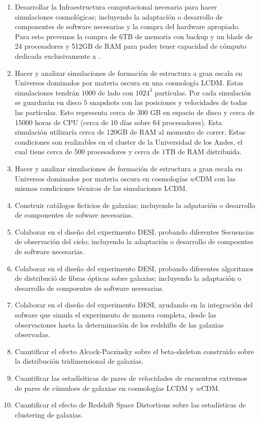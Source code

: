 \begin{enumerate}
\item Desarrollar la Infraestructura computacional necesaria para hacer simulaciones cosmol\'ogicas; incluyendo la adaptaci\'on o desarrollo de componentes de software necesarias y la compra del hardware apropiado. Para esto prevemos la compra de 6TB de memoria con backup y un blade de 24 procesadores y 512GB de RAM para poder tener capacidad de c\'omputo dedicada exclusivamente a \coco.
\item Hacer y analizar simulaciones de formaci\'on de estructura a gran escala en Universos dominados por materia oscura en una cosmolog\'ia LCDM. Estas simulaciones tendr\'an $1000$ \hMpc de lado con $1024^3$ part\'iculas. Por cada simulaci\'on se guardar\'an en disco $5$ snapshots con las posiciones y velocidades de todas las part\'iculas. Esto representa cerca de $300$ GB en espacio de disco y cerca de 15000 horas de CPU (cerca de 10 d\'ias sobre 64 procesadores). Esta simulaci\'on utilizar\'ia cerca de 120GB de RAM al momento de correr. Estas condiciones son realizables en el cluster de la Universidad de los Andes, el cual tiene cerca de $500$ procesadores y cerca de $1$TB de RAM distribuida.
\item Hacer y analizar simulaciones de formaci\'on de estructura a gran escala en Universos dominados por materia oscura en cosmolog\'ias $w$CDM con las mismas condiciones t\'ecnicas de las simulaciones LCDM.
\item Construir cat\'alogos ficticios de galaxias; incluyendo la adpataci\'on o desarrollo de componentes de sofware necesarias.
\item Colaborar en el dise\~no del experimento DESI, probando diferentes Secuencias de observaci\'on del cielo; 
incluyendo la adaptaci\'on o desarrollo de compoentes de software necesarias.
\item Colaborar en el dise\~no del experimento DESI, probando diferentes algoritmos de distribuci\'o de fibras \'opticas sobre galaxias; incluyendo la adaptaci\'on o desarrollo de compoentes de software necesarias.
\item Colaborar en el dise\~no del experimento DESI, ayudando en la integraci\'on del sofware que simula el experimento de manera completa, desde las observaciones hasta la determinaci\'on de los redshifts de las galaxias observadas.
\item Cuantificar el efecto Alcock-Paczinsky sobre el beta-skeleton construido sobre la distribuci\'on tridimensional de galaxias.
\item Cuantificar las estad\'isiticas de pares de velocidades de encuentros extremos de pares de c\'umuloes de galaxias en cosmolog\'ias LCDM y $w$CDM.
\item Cuantificar el efecto de Redshift Space Distortions sobre las estad\'isticas de clustering de galaxias. 
\end{enumerate}


